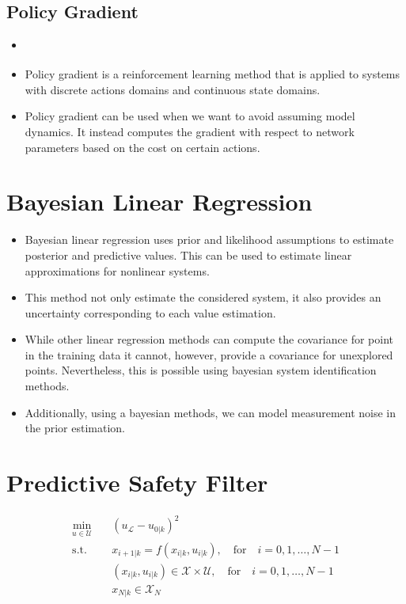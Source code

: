 \documentclass[english]{kththesis}
\newcommand{\X}{\mathcal{X}}
\newcommand{\U}{\mathcal{U}}
\renewcommand{\L}{\mathcal{L}}
\begin{document}
\subsection{Policy Gradient}

\begin{itemize}
    \item \cite{li2019}
    \item Policy gradient is a reinforcement learning method that is applied to systems with discrete actions domains and continuous state domains.
    \item Policy gradient can be used when we want to avoid assuming model dynamics. It instead computes the gradient with respect to network parameters based on the cost on certain actions.
\end{itemize}

\section{Bayesian Linear Regression}

\begin{itemize}
    \item Bayesian linear regression uses prior and likelihood assumptions to estimate posterior and predictive values. This can be used to estimate linear approximations for nonlinear systems.
    \item This method not only estimate the considered system, it also provides an uncertainty  corresponding to each value estimation.
    \item While other linear regression methods can compute the covariance for point in the training data it cannot, however, provide a covariance for unexplored points. Nevertheless, this is possible using bayesian system identification methods.
    \item Additionally, using a bayesian methods, we can model measurement noise in the prior estimation.
\end{itemize}

\section{Predictive Safety Filter}

\begin{equation}\begin{split}
    \min_{u \in \U} \quad &(u_\L - u_{0|k})^2 \\
    \text{s.t.} \quad &x_{i+1|k} = f(x_{i|k}, u_{i|k}), \quad \text{for} \quad i = 0, 1, \dots, N-1 \\
    &(x_{i|k}, u_{i|k}) \in \X \times \U, \quad \text{for} \quad i = 0, 1, \dots, N-1 \\
    &x_{N|k} \in \X_N
\end{split}\end{equation}
\end{document}
